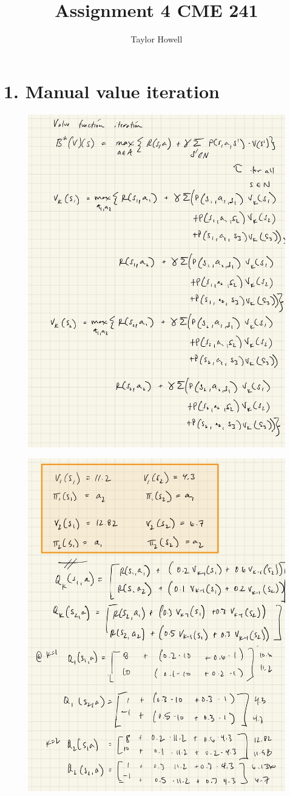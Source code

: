 \documentclass[12pt]{article}
\title{Assignment 4 CME 241}
\author{Taylor Howell}
\begin{document}
\maketitle

\newpage
\section*{1. Manual value iteration}
\begin{figure}[!htb]
	\centering
	\includegraphics[width=.75\textwidth]{ipad/q1_1.jpg}
\end{figure}

\begin{figure}[!htb]
	\centering
	\includegraphics[width=.75\textwidth]{ipad/q1_2.jpg}
\end{figure}
\end{document}
